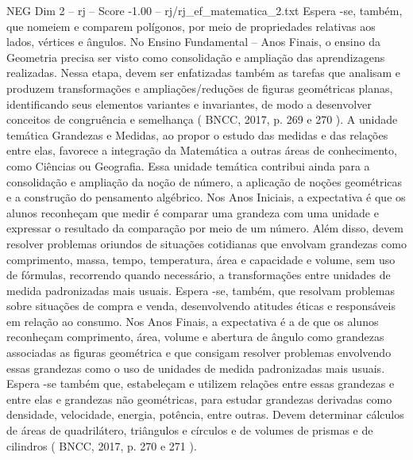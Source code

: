 \begin{textsample}{NEG Dim 2 – rj – Score -1.00 – rj/rj\_ef\_matematica\_2.txt}
Espera -se, também, que nomeiem e comparem polígonos, por meio de propriedades relativas aos lados, vértices e ângulos.
No Ensino Fundamental – Anos Finais, o ensino da Geometria precisa ser visto como consolidação e ampliação das aprendizagens realizadas.
Nessa etapa, devem ser enfatizadas também as tarefas que analisam e produzem transformações e ampliações/reduções de figuras geométricas planas, identificando seus elementos variantes e invariantes, de modo a desenvolver conceitos de congruência e semelhança ( BNCC, 2017, p. 269 e 270 ).
A unidade temática Grandezas e Medidas, ao propor o estudo das medidas e das relações entre elas, favorece a integração da Matemática a outras áreas de conhecimento, como Ciências ou Geografia.
Essa unidade temática contribui ainda para a consolidação e ampliação da noção de número, a aplicação de noções geométricas e a construção do pensamento algébrico.
Nos Anos Iniciais, a expectativa é que os alunos reconheçam que medir é comparar uma grandeza com uma unidade e expressar o resultado da comparação por meio de um número.
Além disso, devem resolver problemas oriundos de situações cotidianas que envolvam grandezas como comprimento, massa, tempo, temperatura, área e capacidade e volume, sem uso de fórmulas, recorrendo quando necessário, a transformações entre unidades de medida padronizadas mais usuais.
Espera -se, também, que resolvam problemas sobre situações de compra e venda, desenvolvendo atitudes éticas e responsáveis em relação ao consumo.
Nos Anos Finais, a expectativa é a de que os alunos reconheçam comprimento, área, volume e abertura de ângulo como grandezas associadas as figuras geométrica e que consigam resolver problemas envolvendo essas grandezas como o uso de unidades de medida padronizadas mais usuais.
Espera -se também que, estabeleçam e utilizem relações entre essas grandezas e entre elas e grandezas não geométricas, para estudar grandezas derivadas como densidade, velocidade, energia, potência, entre outras.
Devem determinar cálculos de áreas de quadrilátero, triângulos e círculos e de volumes de prismas e de cilindros ( BNCC, 2017, p. 270 e 271 ).

\end{textsample}
